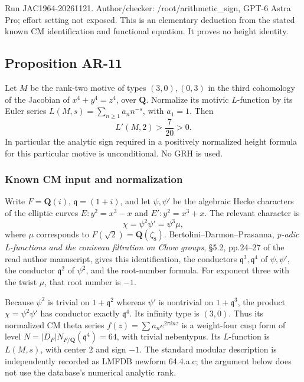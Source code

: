 \documentclass[11pt,a4paper]{article}
\begin{document}
Run JAC1964-20261121. Author/checker: /root/arithmetic\_sign, GPT-6
Astra Pro; effort setting not exposed. This is an elementary deduction
from the stated known CM identification and functional equation. It
proves no height identity.

\subsection{Proposition AR-11}\label{proposition-ar-11}

Let \(M\) be the rank-two motive of types \((3,0),(0,3)\) in the third
cohomology of the Jacobian of \(x^4+y^4=z^4\), over \(\mathbf Q\).
Normalize its motivic \(L\)-function by its Euler series
\(L(M,s)=\sum_{n\ge1}a_n n^{-s}\), with \(a_1=1\). Then \[
L'(M,2)>\frac7{20}>0.
\tag{AR.14}
\] In particular the analytic sign required in a positively normalized
height formula for this particular motive is unconditional. No GRH is
used.

\subsubsection{Known CM input and
normalization}\label{known-cm-input-and-normalization}

Write \(F=\mathbf Q(i)\), \(\mathfrak q=(1+i)\), and let \(\psi,\psi'\)
be the algebraic Hecke characters of the elliptic curves \(E:y^2=x^3-x\)
and \(E':y^2=x^3+x\). The relevant character is \[
\chi=\psi^2\psi'=\psi^3\mu,
\] where \(\mu\) corresponds to \(F(\sqrt2)=\mathbf Q(\zeta_8)\).
Bertolini--Darmon--Prasanna, \emph{p-adic L-functions and the coniveau
filtration on Chow groups}, §5.2, pp.24--27 of the read author
manuscript, gives this identification, the conductors
\(\mathfrak q^3,\mathfrak q^4\) of \(\psi,\psi'\), the conductor
\(\mathfrak q^2\) of \(\psi^2\), and the root-number formula. For
exponent three with the twist \(\mu\), that root number is \(-1\).

Because \(\psi^2\) is trivial on \(1+\mathfrak q^2\) whereas \(\psi'\)
is nontrivial on \(1+\mathfrak q^3\), the product \(\chi=\psi^2\psi'\)
has conductor exactly \(\mathfrak q^4\). Its infinity type is \((3,0)\).
Thus its normalized CM theta series \(f(z)=\sum a_n e^{2\pi i nz}\) is a
weight-four cusp form of level
\(N=|D_F|N_{F/\mathbf Q}(\mathfrak q^4)=64\), with trivial nebentypus.
Its \(L\)-function is \(L(M,s)\), with center \(2\) and sign \(-1\). The
standard modular description is independently recorded as LMFDB newform
64.4.a.c; the argument below does not use the database's numerical
analytic rank.
\end{document}
